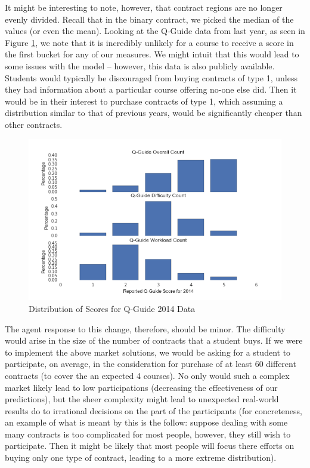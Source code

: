 It might be interesting to note, however, that contract regions are no longer evenly divided. Recall that in the binary contract, we picked the median of the values (or even the mean). Looking at the Q-Guide data from last year, as seen in Figure \ref{fig:distribution}, we note that it is incredibly unlikely for a course to receive a score in the first bucket for any of our measures. We might intuit that this would lead to some issues with the model -- however, this data is also publicly available. Students would typically be discouraged from buying contracts of type 1, unless they had information about a particular course offering no-one else did. Then it would be in their interest to purchase contracts of type 1, which assuming a distribution similar to that of previous years, would be significantly cheaper than other contracts.

\begin{figure}[h!]
\centering
\includegraphics[scale=0.5]{distribution}
\caption{Distribution of Scores for Q-Guide 2014 Data}
\label{fig:distribution}
\end{figure}

The agent response to this change, therefore, should be minor. The difficulty would arise in the size of the number of contracts that a student buys. If we were to implement the above market solutions, we would be asking for a student to participate, on average, in the consideration for purchase of at least 60 different contracts (to cover the an expected 4 courses). No only would such a complex market likely lead to low participations (decreasing the effectiveness of our predictions), but the sheer complexity might lead to unexpected real-world results do to irrational decisions on the part of the participants (for concreteness, an example of what is meant by this is the follow: suppose dealing with some many contracts is too complicated for most people, however, they still wish to participate. Then it might be likely that most people will focus there efforts on buying only one type of contract, leading to a more extreme distribution).

